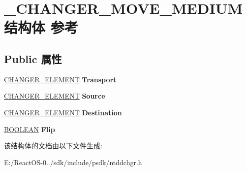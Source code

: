 \hypertarget{struct___c_h_a_n_g_e_r___m_o_v_e___m_e_d_i_u_m}{}\section{\+\_\+\+C\+H\+A\+N\+G\+E\+R\+\_\+\+M\+O\+V\+E\+\_\+\+M\+E\+D\+I\+U\+M结构体 参考}
\label{struct___c_h_a_n_g_e_r___m_o_v_e___m_e_d_i_u_m}
\subsection*{Public 属性}
\begin{DoxyCompactItemize}
\item 
\mbox{\label{struct___c_h_a_n_g_e_r___m_o_v_e___m_e_d_i_u_m_aad03efe97fe6f3fd6fea50014d5be774}} 
\hyperlink{struct___c_h_a_n_g_e_r___e_l_e_m_e_n_t}{C\+H\+A\+N\+G\+E\+R\+\_\+\+E\+L\+E\+M\+E\+NT} {\bfseries Transport}
\item 
\mbox{\label{struct___c_h_a_n_g_e_r___m_o_v_e___m_e_d_i_u_m_ac96b4c40197419fc824c411a9d9cedc1}} 
\hyperlink{struct___c_h_a_n_g_e_r___e_l_e_m_e_n_t}{C\+H\+A\+N\+G\+E\+R\+\_\+\+E\+L\+E\+M\+E\+NT} {\bfseries Source}
\item 
\mbox{\label{struct___c_h_a_n_g_e_r___m_o_v_e___m_e_d_i_u_m_ace07778198defb1e217be17e21754430}} 
\hyperlink{struct___c_h_a_n_g_e_r___e_l_e_m_e_n_t}{C\+H\+A\+N\+G\+E\+R\+\_\+\+E\+L\+E\+M\+E\+NT} {\bfseries Destination}
\item 
\mbox{\label{struct___c_h_a_n_g_e_r___m_o_v_e___m_e_d_i_u_m_ac2d995caa8a1a94b564bff1a8ba307f4}} 
\hyperlink{_processor_bind_8h_a112e3146cb38b6ee95e64d85842e380a}{B\+O\+O\+L\+E\+AN} {\bfseries Flip}
\end{DoxyCompactItemize}


该结构体的文档由以下文件生成\+:\begin{DoxyCompactItemize}
\item 
E\+:/\+React\+O\+S-\/0../sdk/include/psdk/ntddchgr.\+h\end{DoxyCompactItemize}
